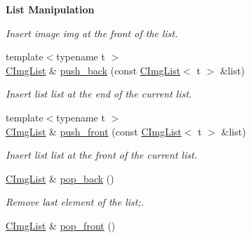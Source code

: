 \begin{Indent}{\bf List Manipulation}
\begin{DoxyCompactItemize}
\begin{DoxyCompactList}\small\item\em Insert image {\ttfamily img} at the front of the list. \end{DoxyCompactList}\item 
\hypertarget{structcimg__library_1_1_c_img_list_a6e6de8a0cea1a7e232c218614d7a881e}{{\footnotesize template$<$typename t $>$ }\\\hyperlink{structcimg__library_1_1_c_img_list}{C\-Img\-List} \& \hyperlink{structcimg__library_1_1_c_img_list_a6e6de8a0cea1a7e232c218614d7a881e}{push\-\_\-back} (const \hyperlink{structcimg__library_1_1_c_img_list}{C\-Img\-List}$<$ t $>$ \&list)}\label{structcimg__library_1_1_c_img_list_a6e6de8a0cea1a7e232c218614d7a881e}

\begin{DoxyCompactList}\small\item\em Insert list {\ttfamily list} at the end of the current list. \end{DoxyCompactList}\item 
\hypertarget{structcimg__library_1_1_c_img_list_a35111ac4e3d4a9cb5c79bdcfe8e38e1b}{{\footnotesize template$<$typename t $>$ }\\\hyperlink{structcimg__library_1_1_c_img_list}{C\-Img\-List} \& \hyperlink{structcimg__library_1_1_c_img_list_a35111ac4e3d4a9cb5c79bdcfe8e38e1b}{push\-\_\-front} (const \hyperlink{structcimg__library_1_1_c_img_list}{C\-Img\-List}$<$ t $>$ \&list)}\label{structcimg__library_1_1_c_img_list_a35111ac4e3d4a9cb5c79bdcfe8e38e1b}

\begin{DoxyCompactList}\small\item\em Insert list {\ttfamily list} at the front of the current list. \end{DoxyCompactList}\item 
\hypertarget{structcimg__library_1_1_c_img_list_a8e152920fa1294c225236a233ff37fee}{\hyperlink{structcimg__library_1_1_c_img_list}{C\-Img\-List} \& \hyperlink{structcimg__library_1_1_c_img_list_a8e152920fa1294c225236a233ff37fee}{pop\-\_\-back} ()}\label{structcimg__library_1_1_c_img_list_a8e152920fa1294c225236a233ff37fee}

\begin{DoxyCompactList}\small\item\em Remove last element of the list;. \end{DoxyCompactList}\item 
\hypertarget{structcimg__library_1_1_c_img_list_a8450a9d39177a13dd1a36460ea7cbda6}{\hyperlink{structcimg__library_1_1_c_img_list}{C\-Img\-List} \& \hyperlink{structcimg__library_1_1_c_img_list_a8450a9d39177a13dd1a36460ea7cbda6}{pop\-\_\-front} ()}\label{structcimg__library_1_1_c_img_list_a8450a9d39177a13dd1a36460ea7cbda6}


\end{DoxyCompactItemize}
\end{Indent}
